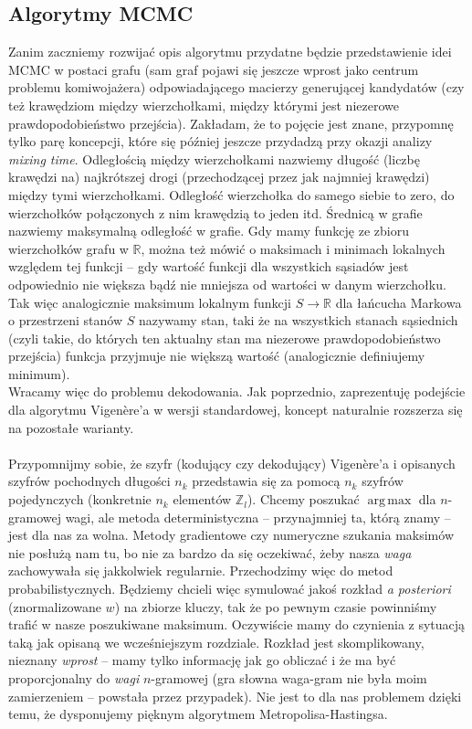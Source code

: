 \documentclass[a4paper]{article}
\DeclareMathOperator*{\argmax}{arg\,max}
\theoremstyle{defn}
\theoremstyle{theorem}
\theoremstyle{lemma}
\theoremstyle{cor}
\theoremstyle{fact}
\begin{document}
\subsection{Algorytmy MCMC}
Zanim zaczniemy rozwijać opis algorytmu przydatne będzie przedstawienie idei MCMC w postaci grafu (sam graf pojawi się jeszcze wprost jako centrum problemu komiwojażera) odpowiadającego macierzy generującej kandydatów (czy też krawędziom między wierzchołkami, między którymi jest niezerowe prawdopodobieństwo przejścia). Zakładam, że to pojęcie jest znane, przypomnę tylko parę koncepcji, które się później jeszcze przydadzą przy okazji analizy \textit{mixing time}. Odległością między wierzchołkami nazwiemy długość (liczbę krawędzi na) najkrótszej drogi (przechodzącej przez jak najmniej krawędzi) między tymi wierzchołkami. Odległość wierzchołka do samego siebie to zero, do wierzchołków połączonych z nim krawędzią to jeden itd. Średnicą w grafie nazwiemy maksymalną odległość w grafie. Gdy mamy funkcję ze zbioru wierzchołków grafu w $\mathbb{R}$, można też mówić o maksimach i minimach lokalnych względem tej funkcji – gdy wartość funkcji dla wszystkich sąsiadów jest odpowiednio nie większa bądź nie mniejsza od wartości w danym wierzchołku. Tak więc analogicznie maksimum lokalnym funkcji $S \to \mathbb{R}$ dla  łańcucha Markowa o przestrzeni stanów $S$ nazywamy stan, taki że na wszystkich stanach sąsiednich (czyli takie, do których ten aktualny stan ma niezerowe prawdopodobieństwo przejścia) funkcja przyjmuje nie większą wartość (analogicznie definiujemy minimum).\\
Wracamy więc do problemu dekodowania. Jak poprzednio, zaprezentuję podejście dla algorytmu Vigenère'a w wersji standardowej, koncept naturalnie rozszerza się na pozostałe warianty. \\\\
Przypomnijmy sobie, że szyfr (kodujący czy dekodujący) Vigenère'a i opisanych szyfrów pochodnych długości $n_k$ przedstawia się za pomocą $n_k$ szyfrów pojedynczych (konkretnie $n_k$ elementów $\mathbb{Z}_l$). Chcemy poszukać $\argmax$ dla $n$-gramowej wagi, ale metoda deterministyczna – przynajmniej ta, którą znamy – jest dla nas za wolna. Metody gradientowe czy numeryczne szukania maksimów nie posłużą nam tu, bo nie za bardzo da się oczekiwać, żeby nasza \textit{waga} zachowywała się jakkolwiek regularnie. Przechodzimy więc do metod probabilistycznych. Będziemy chcieli więc symulować jakoś rozkład \textit{a posteriori} (znormalizowane $w$) na zbiorze kluczy, tak że po pewnym czasie powinniśmy trafić w nasze poszukiwane maksimum. Oczywiście mamy do czynienia z sytuacją taką jak opisaną we wcześniejszym rozdziale. Rozkład jest skomplikowany, nieznany \textit{wprost} – mamy tylko informację jak go obliczać i że ma być proporcjonalny do \textit{wagi} $n$-gramowej (gra słowna waga-gram nie była moim zamierzeniem – powstała przez przypadek).  Nie jest to dla nas problemem dzięki temu, że dysponujemy pięknym algorytmem Metropolisa-Hastingsa.\\\\
\end{document}
